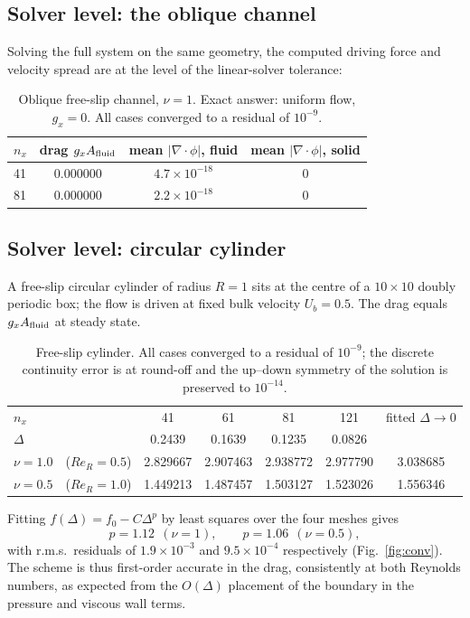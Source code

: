 \documentclass[11pt,a4paper]{article}
\theoremstyle{remark}
\begin{document}
\subsection{Solver level: the oblique channel}
Solving the full system on the same geometry, the computed driving force and velocity spread
are at the level of the linear-solver tolerance:

\begin{table}[h]\centering
\caption{Oblique free-slip channel, $\nu=1$. Exact answer: uniform flow, $g_x=0$. All cases
converged to a residual of $10^{-9}$.}
\label{tab:ch45}
\begin{tabular}{lccc}
\toprule
$n_x$ & drag $g_xA_{\rm fluid}$ & mean $|\nabla\!\cdot\!\phi|$, fluid & mean $|\nabla\!\cdot\!\phi|$, solid\\
\midrule
41 & $0.000000$ & $4.7\times10^{-18}$ & $0$\\
81 & $0.000000$ & $2.2\times10^{-18}$ & $0$\\
\bottomrule
\end{tabular}
\end{table}

\subsection{Solver level: circular cylinder}
A free-slip circular cylinder of radius $R=1$ sits at the centre of a $10\times10$ doubly
periodic box; the flow is driven at fixed bulk velocity $U_b=0.5$. The drag equals
$g_xA_{\rm fluid}$ at steady state.

\begin{table}[h]\centering
\caption{Free-slip cylinder. All cases converged to a residual of $10^{-9}$; the discrete
continuity error is at round-off and the up--down symmetry of the solution is preserved to
$10^{-14}$.}
\label{tab:cyl}
\begin{tabular}{lccccc}
\toprule
$n_x$ & 41 & 61 & 81 & 121 & fitted $\Delta\to0$\\
$\Delta$ & 0.2439 & 0.1639 & 0.1235 & 0.0826 & \\
\midrule
$\nu=1.0$\ \ ($Re_R=0.5$) & 2.829667 & 2.907463 & 2.938772 & 2.977790 & 3.038685\\
$\nu=0.5$\ \ ($Re_R=1.0$) & 1.449213 & 1.487457 & 1.503127 & 1.523026 & 1.556346\\
\bottomrule
\end{tabular}
\end{table}

Fitting $f(\Delta)=f_0-C\Delta^{p}$ by least squares over the four meshes gives
\begin{equation}
p=1.12\ \ (\nu=1),\qquad p=1.06\ \ (\nu=0.5),
\end{equation}
with r.m.s.\ residuals of $1.9\times10^{-3}$ and $9.5\times10^{-4}$ respectively
(Fig.~\ref{fig:conv}). The scheme is thus first-order accurate in the drag, consistently at
both Reynolds numbers, as expected from the $O(\Delta)$ placement of the boundary in the
pressure and viscous wall terms.
\end{document}
